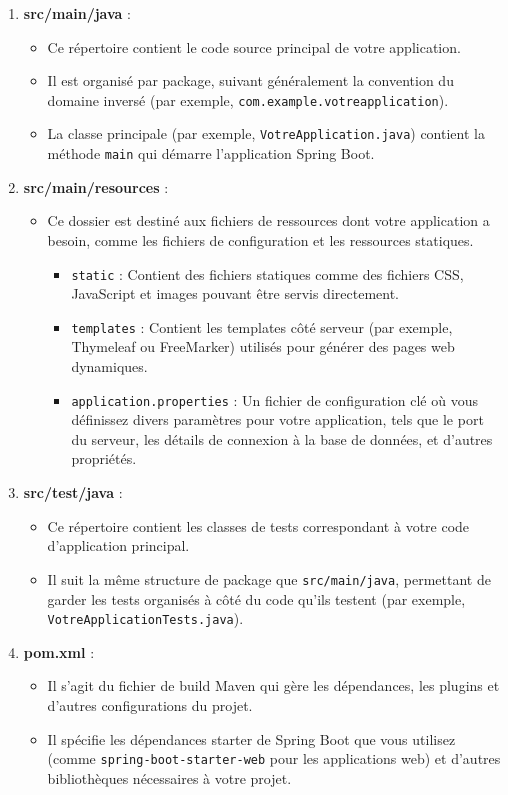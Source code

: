 \documentclass{article}
\begin{document}
\begin{enumerate}
    \item \textbf{src/main/java} : 
    \begin{itemize}
        \item Ce répertoire contient le code source principal de votre application.
        \item Il est organisé par package, suivant généralement la convention du domaine inversé (par exemple, \texttt{com.example.votreapplication}).
        \item La classe principale (par exemple, \texttt{VotreApplication.java}) contient la méthode \texttt{main} qui démarre l'application Spring Boot.
    \end{itemize}

    \item \textbf{src/main/resources} :
    \begin{itemize}
        \item Ce dossier est destiné aux fichiers de ressources dont votre application a besoin, comme les fichiers de configuration et les ressources statiques.
        \begin{itemize}
            \item \texttt{static} : Contient des fichiers statiques comme des fichiers CSS, JavaScript et images pouvant être servis directement.
            \item \texttt{templates} : Contient les templates côté serveur (par exemple, Thymeleaf ou FreeMarker) utilisés pour générer des pages web dynamiques.
            \item \texttt{application.properties} : Un fichier de configuration clé où vous définissez divers paramètres pour votre application, tels que le port du serveur, les détails de connexion à la base de données, et d'autres propriétés.
        \end{itemize}
    \end{itemize}

    \item \textbf{src/test/java} :
    \begin{itemize}
        \item Ce répertoire contient les classes de tests correspondant à votre code d'application principal.
        \item Il suit la même structure de package que \texttt{src/main/java}, permettant de garder les tests organisés à côté du code qu'ils testent (par exemple, \texttt{VotreApplicationTests.java}).
    \end{itemize}

    \item \textbf{pom.xml} :
    \begin{itemize}
        \item Il s'agit du fichier de build Maven qui gère les dépendances, les plugins et d'autres configurations du projet.
        \item Il spécifie les dépendances starter de Spring Boot que vous utilisez (comme \texttt{spring-boot-starter-web} pour les applications web) et d'autres bibliothèques nécessaires à votre projet.
    \end{itemize}
\end{enumerate}
\end{document}
